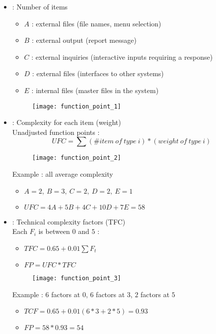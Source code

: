 \begin{itemize}
    \item {} : Number of items
    \begin{itemize}
        \item $A$ : external files (file names, menu selection)
        \item $B$ : external output (report message)
        \item $C$ : external inquiries (interactive inputs requiring a response)
        \item $D$ : external files (interfaces to other systems)
        \item $E$ : internal files (master files in the system)
    \end{itemize}
    \begin{figure}[H]
        \centering
        \texttt{[image: function\_point\_1]}
    \end{figure}
    
    \item {} : Complexity for each item (weight)\\
    Unadjusted function points :
    $$UFC = \sum(\#item\ of\ type\ i) * (weight\ of\ type\ i)$$
    \begin{figure}[H]
        \centering
        \texttt{[image: function\_point\_2]}
    \end{figure}
    Example : all average complexity
    \begin{itemize}
        \item $A = 2,\ B = 3,\ C = 2,\ D = 2,\ E = 1$
        \item $UFC = 4 A + 5 B + 4 C + 10 D + 7 E = 58$
    \end{itemize}
    \item {} : Technical complexity factors (TFC)\\
    Each $F_i$ is between $0$ and $5$ :
    \begin{itemize}
        \item $TFC = 0.65 + 0.01 \sum F_t$
        \item $FP = UFC * TFC$
    \end{itemize}
    \begin{figure}[H]
        \centering
        \texttt{[image: function\_point\_3]}
    \end{figure}
    Example : $6$ factors at $0$, $6$ factors at $3$, $2$ factors at $5$
    \begin{itemize}
        \item $TCF = 0.65 + 0.01 (6 * 3 + 2 * 5) = 0.93$
        \item $FP = 58 * 0.93 = 54$
    \end{itemize}
\end{itemize}


